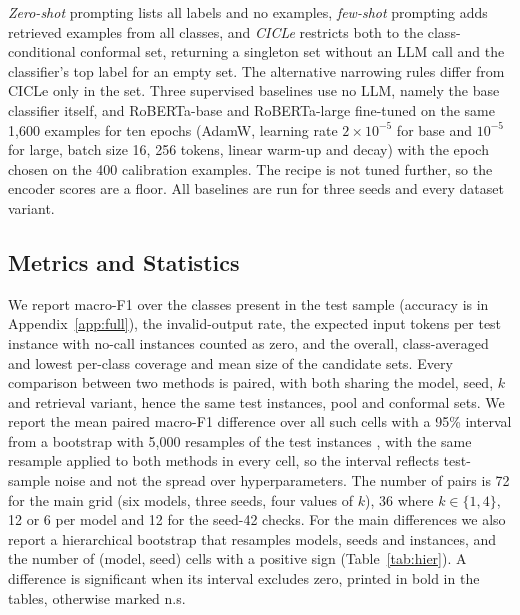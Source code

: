 \emph{Zero-shot} prompting lists all labels and no examples, \emph{few-shot} prompting adds retrieved examples from all classes, and \emph{CICLe} restricts both to the class-conditional conformal set, returning a singleton set without an LLM call and the classifier's top label for an empty set.
The alternative narrowing rules differ from CICLe only in the set.
Three supervised baselines use no LLM, namely the base classifier itself, and RoBERTa-base and RoBERTa-large \citep{liu2019roberta} fine-tuned on the same 1,600 examples for ten epochs (AdamW, learning rate $2 \times 10^{-5}$ for base and $10^{-5}$ for large, batch size 16, 256 tokens, linear warm-up and decay) with the epoch chosen on the 400 calibration examples.
The recipe is not tuned further, so the encoder scores are a floor. All baselines are run for three seeds and every dataset variant.

\subsection{Metrics and Statistics}
\label{sec:metrics}

We report macro-F1 over the classes present in the test sample (accuracy is in Appendix~\ref{app:full}), the invalid-output rate, the expected input tokens per test instance with no-call instances counted as zero, and the overall, class-averaged and lowest per-class coverage and mean size of the candidate sets.
Every comparison between two methods is paired, with both sharing the model, seed, $k$ and retrieval variant, hence the same test instances, pool and conformal sets.
We report the mean paired macro-F1 difference over all such cells with a 95\% interval from a bootstrap with 5,000 resamples of the test instances \citep{koehn2004statistical,dror2018hitchhiker}, with the same resample applied to both methods in every cell, so the interval reflects test-sample noise and not the spread over hyperparameters.
The number of pairs is 72 for the main grid (six models, three seeds, four values of $k$), 36 where $k \in \{1, 4\}$, 12 or 6 per model and 12 for the seed-42 checks.
For the main differences we also report a hierarchical bootstrap that resamples models, seeds and instances, and the number of (model, seed) cells with a positive sign (Table~\ref{tab:hier}). A difference is significant when its interval excludes zero, printed in bold in the tables, otherwise marked n.s.
